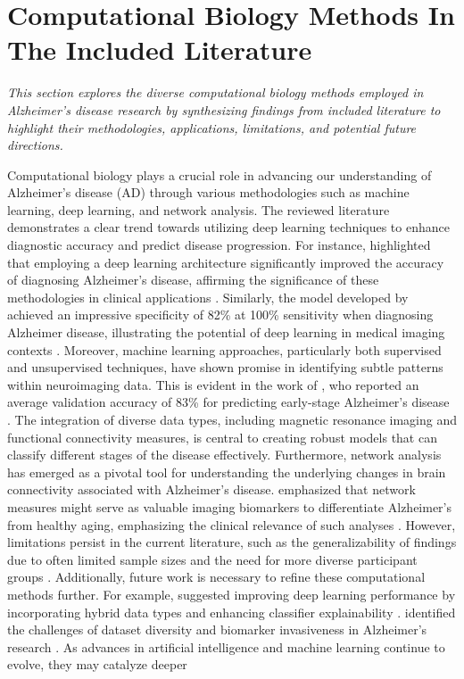 \documentclass{MITcsail}
\begin{document}
\section{Computational Biology Methods In The Included Literature}

\textit{This section explores the diverse computational biology methods employed in Alzheimer’s disease research by synthesizing findings from included literature to highlight their methodologies, applications, limitations, and potential future directions.}

Computational biology plays a crucial role in advancing our understanding of Alzheimer’s disease (AD) through various methodologies such as machine learning, deep learning, and network analysis. The reviewed literature demonstrates a clear trend towards utilizing deep learning techniques to enhance diagnostic accuracy and predict disease progression. For instance, \citet{ref_10_1109_isbi_2014_6868045} highlighted that employing a deep learning architecture significantly improved the accuracy of diagnosing Alzheimer’s disease, affirming the significance of these methodologies in clinical applications \citep{ref_10_1109_isbi_2014_6868045}. Similarly, the model developed by \citet{ref_10_1148_radiol_2018180958} achieved an impressive specificity of 82\% at 100\% sensitivity when diagnosing Alzheimer disease, illustrating the potential of deep learning in medical imaging contexts \citep{ref_10_1148_radiol_2018180958}. Moreover, machine learning approaches, particularly both supervised and unsupervised techniques, have shown promise in identifying subtle patterns within neuroimaging data. This is evident in the work of \citet{ref_10_3389_fpubh_2022_853294}, who reported an average validation accuracy of 83\% for predicting early-stage Alzheimer’s disease \citep{ref_10_3389_fpubh_2022_853294}. The integration of diverse data types, including magnetic resonance imaging and functional connectivity measures, is central to creating robust models that can classify different stages of the disease effectively. Furthermore, network analysis has emerged as a pivotal tool for understanding the underlying changes in brain connectivity associated with Alzheimer’s disease. \citet{ref_10_1371_journal_pcbi_1000100} emphasized that network measures might serve as valuable imaging biomarkers to differentiate Alzheimer’s from healthy aging, emphasizing the clinical relevance of such analyses \citep{ref_10_1371_journal_pcbi_1000100}. However, limitations persist in the current literature, such as the generalizability of findings due to often limited sample sizes and the need for more diverse participant groups \citep{ref_10_1523_jneurosci_2250_06_2006,ref_10_1111_jon_12214}. Additionally, future work is necessary to refine these computational methods further. For example, \citet{ref_10_3389_fnagi_2019_00220} suggested improving deep learning performance by incorporating hybrid data types and enhancing classifier explainability \citep{ref_10_3389_fnagi_2019_00220}. \citet{ref_10_1002_alz_13390} identified the challenges of dataset diversity and biomarker invasiveness in Alzheimer's research \citep{ref_10_1002_alz_13390}. As advances in artificial intelligence and machine learning continue to evolve, they may catalyze deeper 
\end{document}
